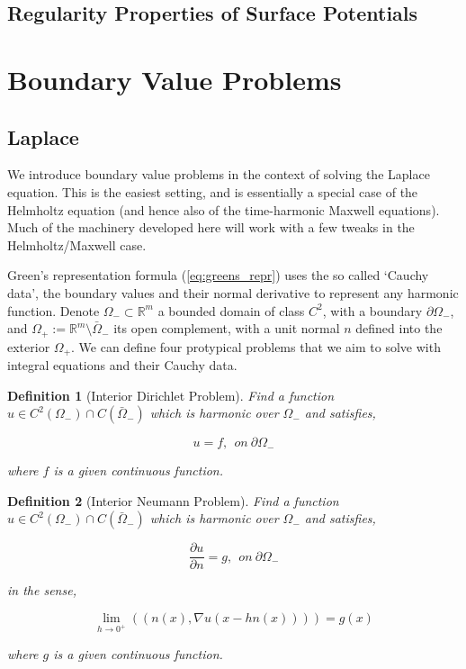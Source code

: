 \documentclass[12pt, a4, twoside]{article}
\newtheorem{definition}{Definition}[section]
\begin{document}
\subsection{Regularity Properties of Surface Potentials}


\section{Boundary Value Problems}

\subsection{Laplace}

We introduce boundary value problems in the context of solving the Laplace equation. This is the easiest setting, and is essentially a special case of the Helmholtz equation (and hence also of the time-harmonic Maxwell equations). Much of the machinery developed here will work with a few tweaks in the Helmholtz/Maxwell case.

Green's representation formula (\ref{eq:greens_repr}) uses the so called `Cauchy data', the boundary values and their normal derivative to represent any harmonic function. Denote $\Omega_- \subset \mathbb{R}^m$ a bounded domain of class $C^2$, with a boundary $\partial \Omega_-$, and $\Omega_+ := \mathbb{R}^m \setminus \bar{\Omega}_-$ its open complement, with a unit normal $n$ defined into the exterior $\Omega_+$. We can define four protypical problems that we aim to solve with integral equations and their Cauchy data.

\begin{definition}[Interior Dirichlet Problem]
    \label{def:int_dir_prob}
    Find a function $u \in C^2(\Omega_-) \cap C(\bar{\Omega}_-)$ which is harmonic over $\Omega_-$ and satisfies,

    $$ u = f, \> \> on \> \partial \Omega_- $$ 

    where $f$ is a given continuous function.

\end{definition}

\begin{definition}[Interior Neumann Problem]
    \label{def:int_neu_prob}
    Find a function $u \in C^2(\Omega_-) \cap C(\bar{\Omega}_-)$ which is harmonic over $\Omega_-$ and satisfies,

    $$ \frac{\partial u}{\partial n} = g, \> \> on \>  \partial \Omega_- $$ 

    in the sense,

    $$ \lim_{h \rightarrow 0^+} ((n(x), \nabla u(x-hn(x)))) = g(x) $$

    where $g$ is a given continuous function.

\end{definition}
\end{document}
